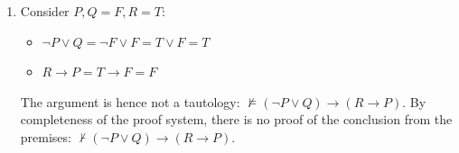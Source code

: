 \documentclass{article}
\begin{document}
\begin{enumerate}
\begin{itemize}
          \end{itemize}
          Notice all premises true but conclusion $P \to \neg R = T \to \neg T = T \to F = F$ is false. Thus the argument is invalid: $P \to Q, Q \to R, \neg P \lor R \not\models P \to \neg R$. Because of soundness of the proof system, there is no proof of the conclusion from the premises: $P \to Q , Q \to R, \neg P \lor R \nvdash P \to \neg R$.
    \item Consider $P,Q=F, R=T$:
          \begin{itemize}
              \item $\neg P \lor Q =  \neg F \lor F = T \lor F = T$
              \item $R \to P = T \to F = F$
          \end{itemize}
          The argument is hence not a tautology: $\not\models (\neg P \lor Q) \to (R \to P)$. By completeness of the proof system, there is no proof of the conclusion from the premises: $\nvdash (\neg P \lor Q) \to (R \to P)$.
\end{enumerate}
\end{document}
